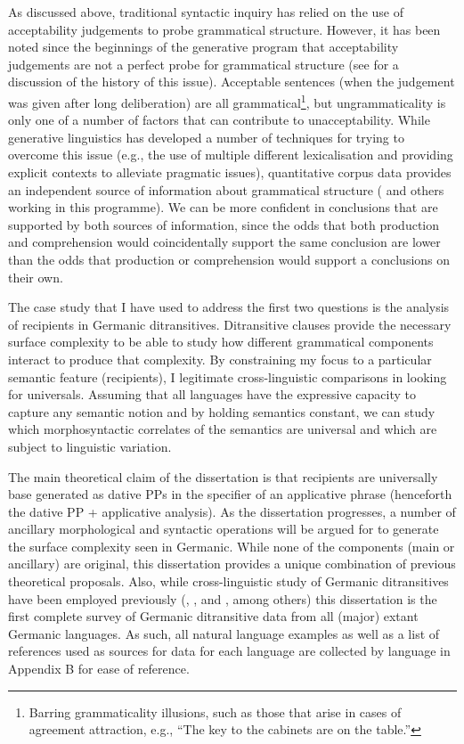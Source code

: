 As discussed above, traditional syntactic inquiry has relied on the use of acceptability judgements to probe grammatical structure. However, it has been noted since the beginnings of the generative program that acceptability judgements are not a perfect probe for grammatical structure (see \citealt{Schutze.1996} for a discussion of the history of this issue). Acceptable sentences (when the judgement was given after long deliberation) are all grammatical\footnote{Barring grammaticality illusions, such as those that arise in cases of agreement attraction, e.g., ``The key to the cabinets are on the table.''}, but ungrammaticality is only one of a number of factors that can contribute to unacceptability. While generative linguistics has developed a number of techniques for trying to overcome this issue (e.g., the use of multiple different lexicalisation and providing explicit contexts to alleviate pragmatic issues), quantitative corpus data provides an independent source of information about grammatical structure (\citealt{Kroch.1989,Kroch.1994} and others working in this programme). We can be more confident in conclusions that are supported by both sources of information, since the odds that both production and comprehension would coincidentally support the same conclusion are lower than the odds that production or comprehension would support a conclusions on their own.

The case study that I have used to address the first two questions is the analysis of recipients in Germanic ditransitives. Ditransitive clauses provide the necessary surface complexity to be able to study how different grammatical components interact to produce that complexity. By constraining my focus to a particular semantic feature (recipients), I legitimate cross-linguistic comparisons in looking for universals. Assuming that all languages have the expressive capacity to capture any semantic notion and by holding semantics constant, we can study which morphosyntactic correlates of the semantics are universal and which are subject to linguistic variation.

The main theoretical claim of the dissertation is that recipients are universally base generated as dative PPs in the specifier of an applicative phrase (henceforth the dative PP + applicative analysis). As the dissertation progresses, a number of ancillary morphological and syntactic operations will be argued for to generate the surface complexity seen in Germanic. While none of the components (main or ancillary) are original, this dissertation provides a unique combination of previous theoretical proposals. Also, while cross-linguistic study of Germanic ditransitives have been employed previously (\citealt{Falk.1990}, \citealt{Sprouse.1995}, and \citealt{Holmberg.1995}, among others) this dissertation is the first complete survey of Germanic ditransitive data from all (major) extant Germanic languages. As such, all natural language examples as well as a list of references used as sources for data for each language are collected by language in Appendix B for ease of reference.

